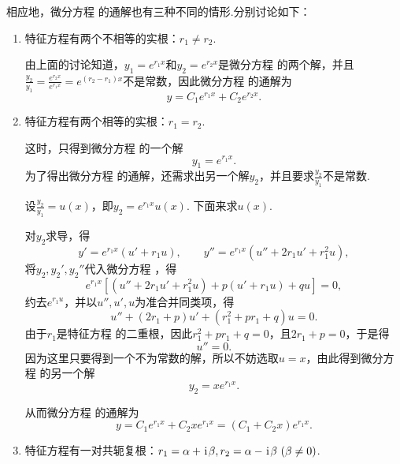相应地，微分方程  的通解也有三种不同的情形.分别讨论如下：\begin{enumerate}
\item 特征方程有两个不相等的实根：\(r_1 \neq r_2\).

由上面的讨论知道，\(y_1 = e^{r_1 x}\)和\(y_2 = e^{r_2 x}\)是微分方程  的两个解，并且\(\frac{y_2}{y_1} = \frac{e^{r_2 x}}{e^{r_1 x}} = e^{(r_2-r_1) x}\)不是常数，因此微分方程  的通解为\[
y = C_1 e^{r_1 x} + C_2 e^{r_2 x}.
\]

\item 特征方程有两个相等的实根：\(r_1 = r_2\).

这时，只得到微分方程  的一个解\[
y_1 = e^{r_1 x}.
\]为了得出微分方程  的通解，还需求出另一个解\(y_2\)，并且要求\(\frac{y_2}{y_1}\)不是常数.

设\(\frac{y_2}{y_1} = u(x)\)，即\(y_2 = e^{r_1 x} u(x)\).
下面来求\(u(x)\).

对\(y_2\)求导，得\[
y' = e^{r_1 x} (u' + r_1 u),
\qquad
y'' = e^{r_1 x} (u'' + 2 r_1 u' + r_1^2 u),
\]将\(y_2,y_2',y_2''\)代入微分方程 ，得\[
e^{r_1 x} [(u'' + 2 r_1 u' + r_1^2 u) + p(u' + r_1 u) + qu] = 0,
\]约去\(e^{r_1 u}\)，并以\(u'',u',u\)为准合并同类项，得\[
u'' + (2 r_1 + p) u' + (r_1^2 + p r_1 + q) u = 0.
\]由于\(r_1\)是特征方程  的二重根，因此\(r_1^2 + p r_1 + q = 0\)，且\(2 r_1 + p = 0\)，于是得\[
u'' = 0.
\]因为这里只要得到一个不为常数的解，所以不妨选取\(u = x\)，由此得到微分方程  的另一个解\[
y_2 = x e^{r_1 x}.
\]

从而微分方程  的通解为\[
y = C_1 e^{r_1 x} + C_2 x e^{r_1 x}
= (C_1 + C_2 x) e^{r_1 x}.
\]

\item 特征方程有一对共轭复根：\(r_1 = \alpha+\kern1pt\mathrm{i}\kern1pt\beta, r_2 = \alpha-\kern1pt\mathrm{i}\kern1pt\beta \ (\beta\neq0)\).


\end{enumerate}

